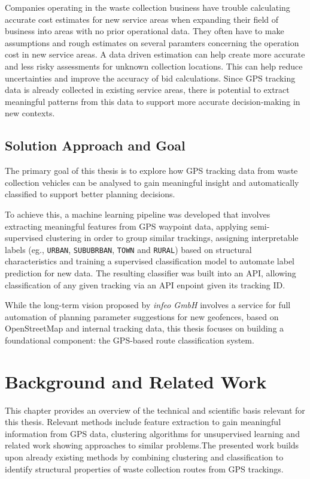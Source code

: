 \documentclass[a4paper,12pt,twoside]{scrreprt}
\begin{document}
Companies operating in the waste collection business have trouble calculating
accurate cost estimates for new service areas when expanding their field of
business into
areas with no prior operational data.
They
often have to make assumptions and rough estimates on several paramters
concerning the operation cost in new service areas. A data driven estimation
can help create more accurate and less risky assessments for unknown collection
locations. This can help reduce uncertainties and improve the accuracy of bid
calculations.
Since GPS tracking data is already collected in existing service
areas, there is potential to extract meaningful patterns from this data to
support more accurate decision-making in new contexts.

\section{Solution Approach and Goal}

The primary goal of this thesis is to explore how GPS tracking data from waste
collection vehicles can be analysed to gain meaningful insight and
automatically classified to support better planning decisions.

To achieve this, a machine learning pipeline was developed that
involves extracting meaningful features from GPS waypoint data, applying
semi-supervised clustering in order to group similar trackings, assigning
interpretable labels (eg., \texttt{URBAN}, \texttt{SUBUBRBAN}, \texttt{TOWN}
and
\texttt{RURAL}) based on structural characteristics and training a supervised
classification model to automate label prediction for new data.
The resulting classifier was built into an API, allowing classification of any
given tracking via an API enpoint given its tracking ID.

While the long-term vision proposed by \textit{infeo GmbH} involves a service
for full automation of planning parameter suggestions for new geofences, based
on OpenStreetMap and internal tracking data, this thesis focuses on building a
foundational component: the GPS-based route classification system.

\chapter{Background and Related Work}
This chapter provides an overview of the technical and scientific basis
relevant for this thesis.
Relevant methods include feature extraction to gain meaningful information
from GPS data, clustering algorithms for unsupervised learning and related work
showing approaches to similar problems.The presented work builds upon already
existing methods by combining
clustering and classification to identify structural properties of waste
collection routes from GPS trackings.
\end{document}
